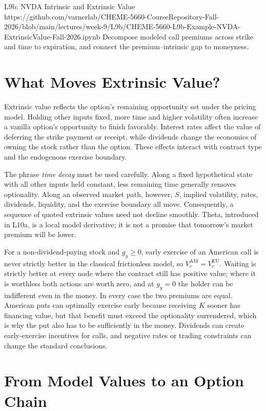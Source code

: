 \documentclass[11pt]{article}
\begin{document}
\notebooklink
  {L9b: NVDA Intrinsic and Extrinsic Value}
  {https://github.com/varnerlab/CHEME-5660-CourseRepository-Fall-2026/blob/main/lectures/week-9/L9b/CHEME-5660-L9b-Example-NVDA-ExtrinsicValue-Fall-2026.ipynb}
  {Decompose modeled call premiums across strike and time to expiration, and connect the premium--intrinsic gap to moneyness.}

\section{What Moves Extrinsic Value?}

Extrinsic value reflects the option's remaining opportunity set under the pricing model. Holding other inputs fixed, more time and higher volatility often increase a vanilla option's opportunity to finish favorably. Interest rates affect the value of deferring the strike payment or receipt, while dividends change the economics of owning the stock rather than the option. These effects interact with contract type and the endogenous exercise boundary.

The phrase \emph{time decay} must be used carefully. Along a fixed hypothetical state with all other inputs held constant, less remaining time generally removes optionality. Along an observed market path, however, $S$, implied volatility, rates, dividends, liquidity, and the exercise boundary all move. Consequently, a sequence of quoted extrinsic values need not decline smoothly. Theta, introduced in L10a, is a local model derivative; it is not a promise that tomorrow's market premium will be lower.

For a non-dividend-paying stock and $g_y\geq 0$, early exercise of an American call is never strictly better in the classical frictionless model, so $V_c^{\mathrm{AM}}=V_c^{\mathrm{EU}}$. Waiting is strictly better at every node where the contract still has positive value; where it is worthless both actions are worth zero, and at $g_y=0$ the holder can be indifferent even in the money. In every case the two premiums are equal. American puts can optimally exercise early because receiving $K$ sooner has financing value, but that benefit must exceed the optionality surrendered, which is why the put also has to be sufficiently in the money. Dividends can create early-exercise incentives for calls, and negative rates or trading constraints can change the standard conclusions.

\section{From Model Values to an Option Chain}
\end{document}
